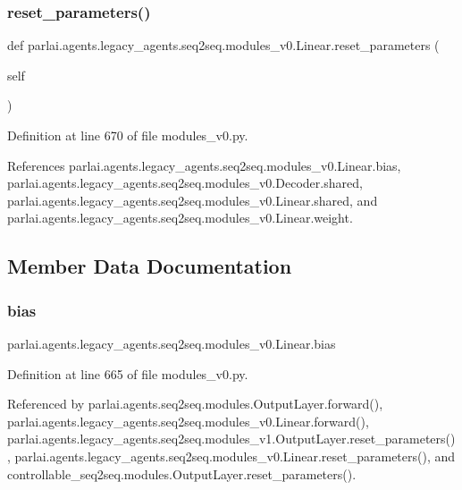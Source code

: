 \subsubsection{\texorpdfstring{reset\+\_\+parameters()}{reset\_parameters()}}
{\footnotesize\ttfamily def parlai.\+agents.\+legacy\+\_\+agents.\+seq2seq.\+modules\+\_\+v0.\+Linear.\+reset\+\_\+parameters (\begin{DoxyParamCaption}\item[{}]{self }\end{DoxyParamCaption})}



Definition at line 670 of file modules\+\_\+v0.\+py.



References parlai.\+agents.\+legacy\+\_\+agents.\+seq2seq.\+modules\+\_\+v0.\+Linear.\+bias, parlai.\+agents.\+legacy\+\_\+agents.\+seq2seq.\+modules\+\_\+v0.\+Decoder.\+shared, parlai.\+agents.\+legacy\+\_\+agents.\+seq2seq.\+modules\+\_\+v0.\+Linear.\+shared, and parlai.\+agents.\+legacy\+\_\+agents.\+seq2seq.\+modules\+\_\+v0.\+Linear.\+weight.



\subsection{Member Data Documentation}
\mbox{\label{classparlai_1_1agents_1_1legacy__agents_1_1seq2seq_1_1modules__v0_1_1Linear_add46cc133ca8a969cee42cef77c87466}} 
\subsubsection{\texorpdfstring{bias}{bias}}
{\footnotesize\ttfamily parlai.\+agents.\+legacy\+\_\+agents.\+seq2seq.\+modules\+\_\+v0.\+Linear.\+bias}



Definition at line 665 of file modules\+\_\+v0.\+py.



Referenced by parlai.\+agents.\+seq2seq.\+modules.\+Output\+Layer.\+forward(), parlai.\+agents.\+legacy\+\_\+agents.\+seq2seq.\+modules\+\_\+v0.\+Linear.\+forward(), parlai.\+agents.\+legacy\+\_\+agents.\+seq2seq.\+modules\+\_\+v1.\+Output\+Layer.\+reset\+\_\+parameters(), parlai.\+agents.\+legacy\+\_\+agents.\+seq2seq.\+modules\+\_\+v0.\+Linear.\+reset\+\_\+parameters(), and controllable\+\_\+seq2seq.\+modules.\+Output\+Layer.\+reset\+\_\+parameters().

